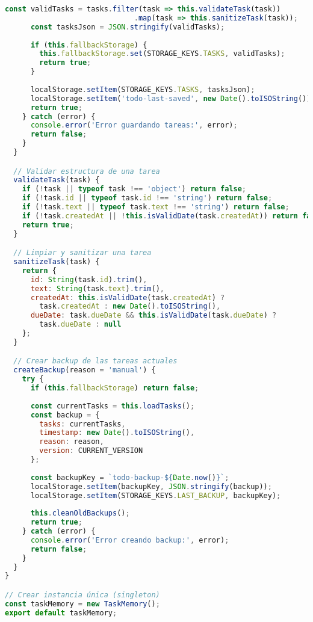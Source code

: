 \documentclass[12pt,a4paper]{article}
\begin{document}
\begin{lstlisting}[language=JavaScript,caption={Sistema robusto de gestión de memoria}]
      const validTasks = tasks.filter(task => this.validateTask(task))
                              .map(task => this.sanitizeTask(task));
      const tasksJson = JSON.stringify(validTasks);
      
      if (this.fallbackStorage) {
        this.fallbackStorage.set(STORAGE_KEYS.TASKS, validTasks);
        return true;
      }
      
      localStorage.setItem(STORAGE_KEYS.TASKS, tasksJson);
      localStorage.setItem('todo-last-saved', new Date().toISOString());
      return true;
    } catch (error) {
      console.error('Error guardando tareas:', error);
      return false;
    }
  }

  // Validar estructura de una tarea
  validateTask(task) {
    if (!task || typeof task !== 'object') return false;
    if (!task.id || typeof task.id !== 'string') return false;
    if (!task.text || typeof task.text !== 'string') return false;
    if (!task.createdAt || !this.isValidDate(task.createdAt)) return false;
    return true;
  }

  // Limpiar y sanitizar una tarea
  sanitizeTask(task) {
    return {
      id: String(task.id).trim(),
      text: String(task.text).trim(),
      createdAt: this.isValidDate(task.createdAt) ? 
        task.createdAt : new Date().toISOString(),
      dueDate: task.dueDate && this.isValidDate(task.dueDate) ? 
        task.dueDate : null
    };
  }

  // Crear backup de las tareas actuales
  createBackup(reason = 'manual') {
    try {
      if (this.fallbackStorage) return false;
      
      const currentTasks = this.loadTasks();
      const backup = {
        tasks: currentTasks,
        timestamp: new Date().toISOString(),
        reason: reason,
        version: CURRENT_VERSION
      };
      
      const backupKey = `todo-backup-${Date.now()}`;
      localStorage.setItem(backupKey, JSON.stringify(backup));
      localStorage.setItem(STORAGE_KEYS.LAST_BACKUP, backupKey);
      
      this.cleanOldBackups();
      return true;
    } catch (error) {
      console.error('Error creando backup:', error);
      return false;
    }
  }
}

// Crear instancia única (singleton)
const taskMemory = new TaskMemory();
export default taskMemory;
\end{lstlisting}
\end{document}
